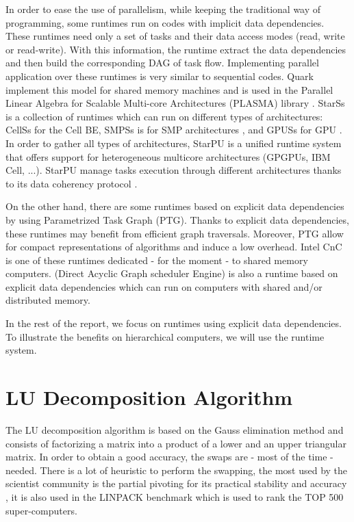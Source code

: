 In order to ease the use of parallelism, while keeping the traditional way of programming, some runtimes run on codes with implicit data dependencies. These runtimes need only a set of tasks and their data access modes (read, write or read-write). With this information, the runtime extract the data dependencies and then build the corresponding DAG of task flow. Implementing parallel application over these runtimes is very similar to sequential codes. Quark implement this model for shared memory machines and is used in the Parallel Linear Algebra for Scalable Multi-core Architectures (PLASMA) library \cite{1742-6596-180-1-012037}.
StarSs is a collection of runtimes which can run on different types of architectures: CellSs for the Cell BE\cite{Bellens06}, SMPSs is for SMP architectures \cite{journals/concurrency/BadiaHLPQQ09}, and GPUSs for GPU \cite{Ayguade09}. In order to gather all types of architectures, StarPU is a unified runtime system that offers support for heterogeneous multicore architectures (GPGPUs, IBM Cell, ...). StarPU manage tasks execution through different architectures thanks to its data coherency protocol \cite{DoBiBo07,journals/concurrency/AugonnetTNW11}.


On the other hand, there are some runtimes based on explicit data dependencies by using Parametrized Task Graph (PTG).
Thanks to explicit data dependencies, these runtimes may benefit from efficient graph traversals. Moreover, PTG allow for compact representations of algorithms and induce a low overhead. Intel CnC is one of these runtimes dedicated - for the moment - to shared memory computers. \dague (Direct Acyclic Graph scheduler Engine) is also a runtime based on explicit data dependencies which can run on computers with shared and/or distributed memory.

In the rest of the report, we focus on runtimes using explicit data dependencies. To illustrate the benefits on hierarchical computers, we will use the \dague runtime system. 

\section{LU Decomposition Algorithm}\label{lu_algo}
The LU decomposition algorithm is based on the Gauss elimination method and consists of factorizing a matrix into a product of a lower and an upper triangular matrix. In order to obtain a good accuracy, the swaps are - most of the time - needed. There is a lot of heuristic to perform the swapping, the most used by the scientist community is the partial pivoting for its practical stability and accuracy \cite{Hig02}, it is also used in the LINPACK benchmark which is used to rank the TOP 500 super-computers.

